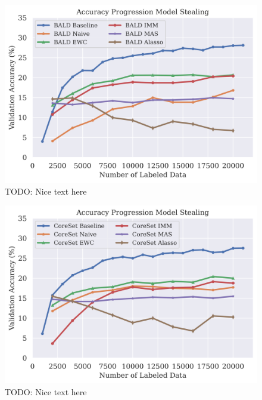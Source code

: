 \begin{figure}[h]
    \centering
    \includegraphics[width=0.8\linewidth]{images/results_CALMS/cifar100_softmax_bald.png}
    \caption[Accuracy Comparison for Model Stealing on CIFAR100 using the softmax output and the Active Learning strategy BALD]{TODO: Nice text here}
    \label{fig:CALMSCIFAR100SoftmaxBALD}
\end{figure}

\begin{figure}[h]
    \centering
    \includegraphics[width=0.8\linewidth]{images/results_CALMS/cifar100_softmax_coreset.png}
    \caption[Accuracy Comparison for Model Stealing on CIFAR100 using the softmax output and the Active Learning strategy CoreSet]{TODO: Nice text here}
    \label{fig:CALMSCIFAR100SoftmaxCoreSet}
\end{figure}

